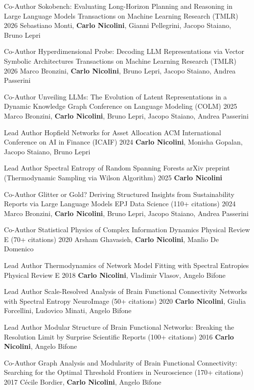 \documentclass[11pt, a4paper]{awesome-cv}
\begin{document}
\begin{cventries}

\cventry
{Co-Author} {Sokobench: Evaluating Long-Horizon Planning and Reasoning in Large Language Models} {Transactions on Machine Learning Research (TMLR)} {2026} {Sebastiano Monti, \textbf{Carlo Nicolini}, Gianni Pellegrini, Jacopo Staiano, Bruno Lepri}

\cventry
{Co-Author} {Hyperdimensional Probe: Decoding LLM Representations via Vector Symbolic Architectures} {Transactions on Machine Learning Research (TMLR)} {2026} {Marco Bronzini, \textbf{Carlo Nicolini}, Bruno Lepri, Jacopo Staiano, Andrea Passerini}

\cventry
{Co-Author} {Unveiling LLMs: The Evolution of Latent Representations in a Dynamic Knowledge Graph} {Conference on Language Modeling (COLM)} {2025} {Marco Bronzini, \textbf{Carlo Nicolini}, Bruno Lepri, Jacopo Staiano, Andrea Passerini}

\cventry
{Lead Author} {Hopfield Networks for Asset Allocation} {ACM International Conference on AI in Finance (ICAIF)} {2024} {\textbf{Carlo Nicolini}, Monisha Gopalan, Jacopo Staiano, Bruno Lepri}

\cventry
{Lead Author} {Spectral Entropy of Random Spanning Forests} {arXiv preprint (Thermodynamic Sampling via Wilson Algorithm)} {2025} {\textbf{Carlo Nicolini}}

\cventry
{Co-Author} {Glitter or Gold? Deriving Structured Insights from Sustainability Reports via Large Language Models} {EPJ Data Science (110+ citations)} {2024} {Marco Bronzini, \textbf{Carlo Nicolini}, Bruno Lepri, Jacopo Staiano, Andrea Passerini}

\cventry
{Co-Author} {Statistical Physics of Complex Information Dynamics} {Physical Review E (70+ citations)} {2020} {Arsham Ghavasieh, \textbf{Carlo Nicolini}, Manlio De Domenico}

\cventry
{Lead Author} {Thermodynamics of Network Model Fitting with Spectral Entropies} {Physical Review E} {2018} {\textbf{Carlo Nicolini}, Vladimir Vlasov, Angelo Bifone}

\cventry
{Lead Author} {Scale-Resolved Analysis of Brain Functional Connectivity Networks with Spectral Entropy} {NeuroImage (50+ citations)} {2020} {\textbf{Carlo Nicolini}, Giulia Forcellini, Ludovico Minati, Angelo Bifone}

\cventry
{Lead Author} {Modular Structure of Brain Functional Networks: Breaking the Resolution Limit by Surprise} {Scientific Reports (100+ citations)} {2016} {\textbf{Carlo Nicolini}, Angelo Bifone}

\cventry
{Co-Author} {Graph Analysis and Modularity of Brain Functional Connectivity: Searching for the Optimal Threshold} {Frontiers in Neuroscience (170+ citations)} {2017} {Cécile Bordier, \textbf{Carlo Nicolini}, Angelo Bifone}

\end{cventries} 
\end{document}
